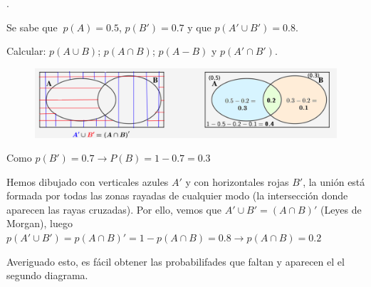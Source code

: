 \begin{ejemplo}
\begin{ejre}\textcolor{gris}{.}

Se sabe que $\ p(A)=0.5$, $p(B')=0.7$ y que $p(A'\cup B')=0.8$. 

Calcular: $p(A\cup B)$;	$p(A\cap B)$; $p(A-B)$ y $p(A'\cap B')$.
\end{ejre}
	\begin{figure}[H]
			\centering
			\includegraphics[width=1\textwidth]{imagenes/imagenes02/T02IM18.png}
	\end{figure}
Como $p(B')=0.7 \to P(B)=1-0.7=0.3$

Hemos dibujado con verticales azules $A'$ y con horizontales rojas $B'$, la unión está formada por todas las zonas rayadas de cualquier modo (la intersección donde aparecen las rayas cruzadas). Por ello, vemos que $A'\cup B'=(A\cap B)'$ (Leyes de Morgan), luego $p(A'\cup B')=p(A\cap B)'=1-p(A\cap B)=0.8 \to p(A\cap B)=0.2$

Averiguado esto, es fácil obtener las probabilifades que faltan y aparecen el el segundo diagrama.
\end{ejemplo}


